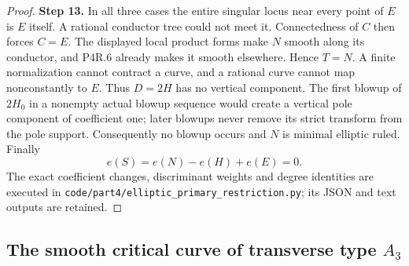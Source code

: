 \begin{proof}
\noindent\textbf{Step 13.} In all three cases the entire singular
locus near every point of $E$ is $E$
itself. A rational conductor tree could
not meet it. Connectedness of $C$ then
forces $C=E$. The displayed local
product forms make $N$ smooth along
its conductor, and P4R.6 already makes
it smooth elsewhere. Hence $T=N$.
A finite normalization cannot contract
a curve, and a rational curve cannot
map nonconstantly to $E$. Thus $D=2H$
has no vertical component. The first
blowup of $2H_0$ in a nonempty actual
blowup sequence would create a vertical
pole component of coefficient one;
later blowups never remove its strict
transform from the pole support.
Consequently no blowup occurs and $N$
is minimal elliptic ruled. Finally
\[
 e(S)=e(N)-e(H)+e(E)=0.
\]
The exact coefficient changes, discriminant
weights and degree identities are executed
in \texttt{code/part4/elliptic\_primary\_restriction.py};
its JSON and text outputs are retained.
\end{proof}

\subsection{The smooth critical curve of transverse type \texorpdfstring{$A_3$}{A3}}


